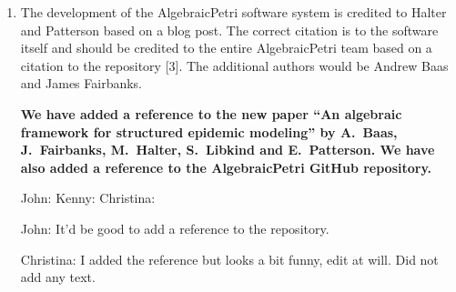 \documentclass[reqno]{amsart}
\def\chris{\color{purple} Christina: }
\def\john{\color{red} John: }
\def\kenny{\color{blue} Kenny: }
\begin{document}
\begin{enumerate}
{\bf We do not know a way to construct a (double) category of open dynamical systems that uses structured cospans; to find one would require getting around the result at the end of Section 6.  This is an interesting challenge.}

{\john $\checkmark$} {\kenny $\checkmark$} {\chris $\checkmark$}

\iffalse
{\chris Should we refer to which result we are talking about? Also, I am a bit confused about the question and answer. I thought reaction networks 
can be described in both ways?}

{\kenny I'm kinda' confused by the question, too, due to its wording. Based on what Dr. Baez said in response, I think they might have meant dynamical systems instead of reaction networks in their last sentence. They even say earlier in their comment that the frameworks are isomorphic for reaction networks.}

{\john The referee was asking about the \emph{semantics} for reaction networks --- that is, dynamical systems!  Reaction networks are the ``syntax'' and dynamical systems are our chosen ``semantics'' for these.  But my reply in boldface was confused --- you're right.  So I've fixed it. 
The ``result at the end of Section 6'' is the one where we show the functor from dynamical systems to finite sets doesn't have a left adjoint.  For 
some reason we didn't make this into a theorem.   Give me a check mark if you're happy now.   }

{\chris I see, thanks!}
\fi

\item The development of the AlgebraicPetri software system is credited to Halter and Patterson based on a blog post. The correct citation is to the 
software itself and should be credited to the entire AlgebraicPetri team based on a citation to the repository [3]. The additional authors would be 
Andrew Baas and James Fairbanks.

{\bf We have added a reference to the new paper ``An
algebraic framework for structured epidemic modeling'' by A.\ Baas, J.\ Fairbanks, M.\ Halter, S.\ Libkind and E.\ Patterson.  We have also added a reference to the AlgebraicPetri GitHub repository.}

{\john \checkmark} {\kenny \checkmark} {\chris \checkmark}

\iffalse
{\john It'd be good to add a reference to the repository.}

{\chris I added the reference but looks a bit funny, edit at will. Did not add any text.}


\end{enumerate}
\end{document}

